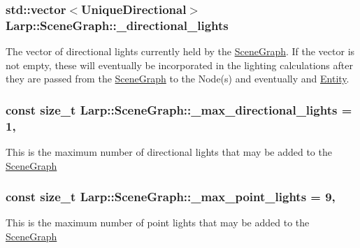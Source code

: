 \subsubsection[{\texorpdfstring{\+\_\+directional\+\_\+lights}{_directional_lights}}]{\setlength{\rightskip}{0pt plus 5cm}std\+::vector$<${\bf Unique\+Directional}$>$ Larp\+::\+Scene\+Graph\+::\+\_\+directional\+\_\+lights\hspace{0.3cm}{\ttfamily [private]}}\hypertarget{classLarp_1_1SceneGraph_adda3dc8da15f0923afd44ff73e47a21c}{}\label{classLarp_1_1SceneGraph_adda3dc8da15f0923afd44ff73e47a21c}
The vector of directional lights currently held by the \hyperlink{classLarp_1_1SceneGraph}{Scene\+Graph}. If the vector is not empty, these will eventually be incorporated in the lighting calculations after they are passed from the \hyperlink{classLarp_1_1SceneGraph}{Scene\+Graph} to the Node(s) and eventually and \hyperlink{classLarp_1_1Entity}{Entity}. 
\subsubsection[{\texorpdfstring{\+\_\+max\+\_\+directional\+\_\+lights}{_max_directional_lights}}]{\setlength{\rightskip}{0pt plus 5cm}const size\+\_\+t Larp\+::\+Scene\+Graph\+::\+\_\+max\+\_\+directional\+\_\+lights = 1\hspace{0.3cm}{\ttfamily [static]}, {\ttfamily [private]}}\hypertarget{classLarp_1_1SceneGraph_aabaeceb65dc86a8f0b84c4a1a099e3d7}{}\label{classLarp_1_1SceneGraph_aabaeceb65dc86a8f0b84c4a1a099e3d7}
This is the maximum number of directional lights that may be added to the \hyperlink{classLarp_1_1SceneGraph}{Scene\+Graph} 
\subsubsection[{\texorpdfstring{\+\_\+max\+\_\+point\+\_\+lights}{_max_point_lights}}]{\setlength{\rightskip}{0pt plus 5cm}const size\+\_\+t Larp\+::\+Scene\+Graph\+::\+\_\+max\+\_\+point\+\_\+lights = 9\hspace{0.3cm}{\ttfamily [static]}, {\ttfamily [private]}}\hypertarget{classLarp_1_1SceneGraph_a1bf0c7f3098c5edfe843d310a4c88f70}{}\label{classLarp_1_1SceneGraph_a1bf0c7f3098c5edfe843d310a4c88f70}
This is the maximum number of point lights that may be added to the \hyperlink{classLarp_1_1SceneGraph}{Scene\+Graph} 

